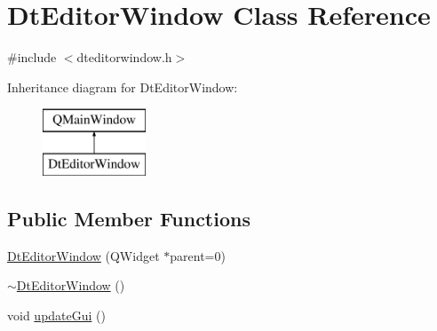 \hypertarget{class_dt_editor_window}{}\section{Dt\+Editor\+Window Class Reference}
\label{class_dt_editor_window}


{\ttfamily \#include $<$dteditorwindow.\+h$>$}

Inheritance diagram for Dt\+Editor\+Window\+:\begin{figure}[H]
\begin{center}
\leavevmode
\includegraphics[height=2.000000cm]{da/da2/class_dt_editor_window}
\end{center}
\end{figure}
\subsection*{Public Member Functions}
\begin{DoxyCompactItemize}
\item 
\mbox{\hyperlink{class_dt_editor_window_a667a7c1012a535991d7e6d9a81f9b560}{Dt\+Editor\+Window}} (Q\+Widget $\ast$parent=0)
\item 
\mbox{\hyperlink{class_dt_editor_window_a2cadbed53f5467119b28446ca07e2e09}{$\sim$\+Dt\+Editor\+Window}} ()
\item 
void \mbox{\hyperlink{class_dt_editor_window_a97dd77748bef76c2b4502ed91d8edcf3}{update\+Gui}} ()
\end{DoxyCompactItemize}
